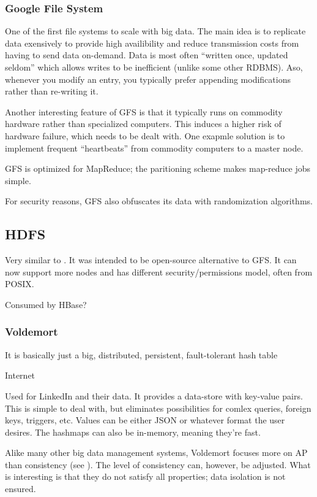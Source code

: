 \subsubsection*{Google File System}\label{sec:GFS}
One of the first file systems to scale with big data. The main idea is to replicate data
exensively to provide high availibility and reduce transmission costs from having to send data on-demand.
Data is most often ``written once, updated seldom'' which allows writes to be inefficient (unlike some other RDBMS). Aso, whenever you modify an entry, you typically prefer appending modifications rather than re-writing it.

Another interesting feature of GFS is that it typically runs on commodity hardware rather than
specialized computers. This induces a higher risk of hardware failure, which needs to be dealt with.
One exapmle solution is to implement frequent ``heartbeats'' from commodity computers to a master node.

GFS is optimized for MapReduce; the paritioning scheme makes map-reduce jobs simple.

For security reasons, GFS also obfuscates its data with randomization algorithms.

\subsection{HDFS}
Very similar to . It was intended to be open-source alternative to GFS.\@
It can now support more nodes and has different security/permissions model, often from POSIX.

Consumed by HBase?

\subsubsection*{Voldemort}
\epigraph{It is basically just a big, distributed, persistent, fault-tolerant hash table}{Internet}

Used for LinkedIn and their data. It provides a data-store with key-value
pairs. This is simple to deal with, but eliminates possibilities for comlex
queries, foreign keys, triggers, etc.  Values can be either JSON or whatever format the user desires.
The hashmaps can also be in-memory, meaning they're fast.

Alike many other big data management systems, Voldemort focuses more on AP than
consistency (see ). The level of consistency can,
however, be adjusted. What is interesting is that they do not satisfy all
 properties; data isolation is not ensured. 

